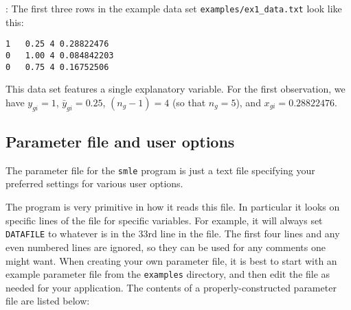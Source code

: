 \documentclass{article}
\begin{document}
\vspace{0.1in}

: The first three rows in the example data 
set {\tt examples/ex1\_data.txt} look like this:
{\scriptsize
\begin{verbatim}
1	0.25 4 0.28822476
0	1.00 4 0.084842203
0	0.75 4 0.16752506
\end{verbatim}
}
This data set features a single explanatory variable.  
For the first observation, we have $y_{gi}=1$, $\bar{y}_{gi}=0.25$, $(n_g-1)=4$ (so that $n_g=5$),
and $x_{gi}=0.28822476$.

\subsection{Parameter file and user options}

The parameter file for the {\tt smle} program is just a text file 
specifying your preferred settings for various user options.  

The program is very primitive in how it reads this file.  In 
particular it looks on specific lines of the file for specific 
variables.  For example, it will always set {\tt DATAFILE} to whatever is in the 
33rd line in the file.  The first four lines and any even numbered
lines are ignored, so they can be used for any comments one might want.
When creating your own parameter file, it is best to start with
an example parameter file from the {\tt examples} directory, and then
edit the file as needed for your application.
The contents of a properly-constructed parameter file are
listed below:
\end{document}
